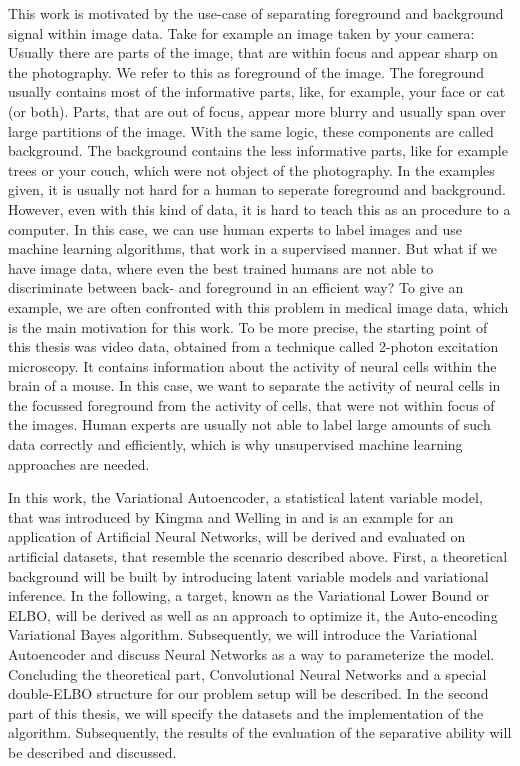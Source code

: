 \documentclass[12pt]{report}
\theoremstyle{definition}
\begin{document}
This work is motivated by the use-case of separating foreground and background signal within image data. Take for example an image taken by your camera: Usually there are parts of the image, that are within focus and appear sharp on the photography. We refer to this as foreground of the image. The foreground usually contains most of the informative parts, like, for example, your face or cat (or both). Parts, that are out of focus, appear more blurry and usually span over large partitions of the image. With the same logic, these components are called background. The background contains the less informative parts, like for example trees or your couch, which were not object of the photography. In the examples given, it is usually not hard for a human to seperate foreground and background. However, even with this kind of data, it is hard to teach this as an procedure to a computer. In this case, we can use human experts to label images and use machine learning algorithms, that work in a supervised manner. But what if we have image data, where even the best trained humans are not able to discriminate between back- and foreground in an efficient way? To give an example, we are often confronted with this problem in medical image data, which is the main motivation for this work. To be more precise, the starting point of this thesis was video data, obtained from a technique called 2-photon excitation microscopy. It contains information about the activity of neural cells within the brain of a mouse. In this case, we want to separate the activity of neural cells in the focussed foreground from the activity of cells, that were not within focus of the images. Human experts are usually not able to label large amounts of such data correctly and efficiently, which is why unsupervised machine learning approaches are needed.

In this work, the Variational Autoencoder, a statistical latent variable model, that was introduced by Kingma and Welling in \cite{kingma2} and is an example for an application of Artificial Neural Networks, will be derived and evaluated on artificial datasets, that resemble the scenario described above. First, a theoretical background will be built by introducing latent variable models and variational inference. In the following, a target, known as the Variational Lower Bound or ELBO, will be derived as well as an approach to optimize it, the Auto-encoding Variational Bayes algorithm. Subsequently, we will introduce the Variational Autoencoder and discuss Neural Networks as a way to parameterize the model. Concluding the theoretical part, Convolutional Neural Networks and a special double-ELBO structure for our problem setup will be described.
In the second part of this thesis, we will specify the datasets and the implementation of the algorithm. Subsequently, the results of the evaluation of the separative ability will be described and discussed.
\end{document}
